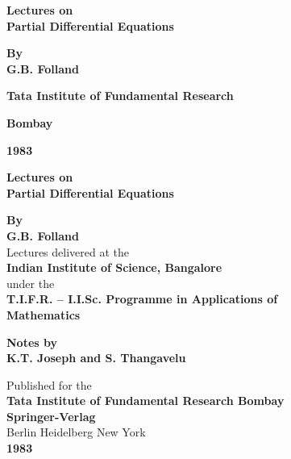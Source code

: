 \thispagestyle{empty}
\begin{center}
{\Large\bf Lectures on}\\[5pt]
{\Large\bf Partial Differential Equations}
\vskip 1cm

{\bf By}\\[5pt]
{\large\bf G.B. Folland}
\vfill

{\bf Tata Institute of Fundamental Research}

{\bf Bombay}

{\bf 1983}
\end{center}

\eject

\thispagestyle{empty}
\begin{center}
{\Large\bf Lectures on}\\[5pt]
{\Large\bf Partial Differential Equations}
\vskip 1cm

{\bf By}\\[5pt]
{\large\bf G.B. Folland}\\[5pt]
{Lectures delivered at the}\\[5pt]
{\bf Indian Institute of Science, Bangalore}\\[15pt]
{under the}\\[5pt]
{\bf T.I.F.R.  -- I.I.Sc. Programme in Applications of}\\[5pt]
{\bf Mathematics}
\vfill

{\bf Notes by}\\[5pt]
{\large\bf K.T. Joseph and S. Thangavelu}
\vfill

{Published for the}\\
{\large\bf Tata Institute of Fundamental Research Bombay}\\
{\large\bf Springer-Verlag}\\
{Berlin Heidelberg New York}\\
{\large\bf 1983}
\end{center}

\eject


